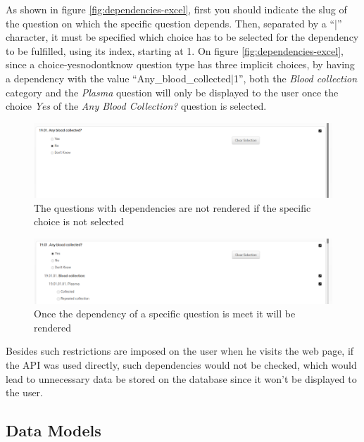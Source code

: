 As shown in figure \ref{fig:dependencies-excel}, first you should indicate the slug of the question on which the specific question depends.
Then, separated by a ``|'' character, it must be specified which choice has to be selected for the dependency to be fulfilled, using its index, starting at 1.
On figure \ref{fig:dependencies-excel}, since a choice-yesnodontknow question type has three implicit choices, by having a dependency with the value ``Any\_blood\_collected|1'', both the \textit{Blood collection} category and the \textit{Plasma} question will only be displayed to the user once the choice \textit{Yes} of the \textit{Any Blood Collection?} question is selected.

\begin{figure}
    \center
    \includegraphics[width=0.75\linewidth]{dependencies-no}
    \caption{The questions with dependencies are not rendered if the specific choice is not selected}
    \label{fig:dependencies-no}
\end{figure}

\begin{figure}
    \center
    \includegraphics[width=0.75\linewidth]{dependencies-yes}
    \caption{Once the dependency of a specific question is meet it will be rendered}
    \label{fig:dependencies-yes}
\end{figure}

Besides such restrictions are imposed on the user when he visits the web page, if the API was used directly, such dependencies would not be checked, which would lead to unnecessary data be stored on the database since it won't be displayed to the user.

\subsection{Data Models}


